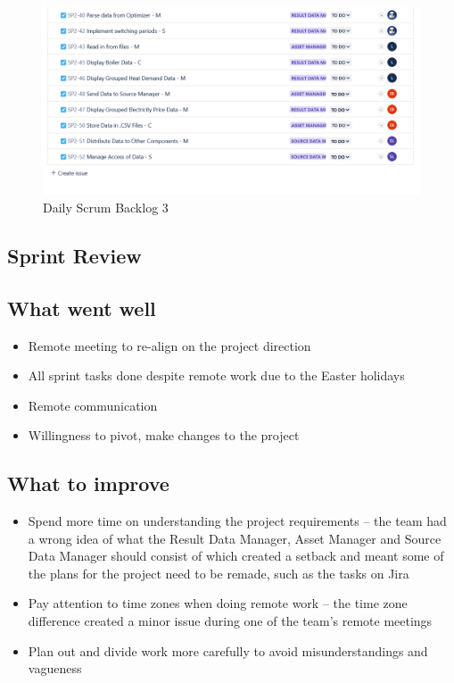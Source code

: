 \documentclass[12pt]{report}
\begin{document}
\begin{figure}[H]
  \centering
  \includegraphics[width=1\textwidth]{Resources/2-Sprint/Daily-Scrum/backlog3.png}
  \caption{Daily Scrum Backlog 3}
  \label{fig:S2Scrum3-image}
\end{figure}


\subsection*{Sprint Review}

\subsection*{What went well}
\begin{itemize}
    \item Remote meeting to re-align on the project direction
    \item All sprint tasks done despite remote work due to the Easter holidays
    \item Remote communication
    \item Willingness to pivot, make changes to the project
\end{itemize}

\subsection*{What to improve}
\begin{itemize}
    \item Spend more time on understanding the project requirements -- the team had a wrong idea of what the Result Data Manager, Asset Manager and Source Data Manager should consist of which created a setback and meant some of the plans for the project need to be remade, such as the tasks on Jira
    \item Pay attention to time zones when doing remote work -- the time zone difference created a minor issue during one of the team's remote meetings
    \item Plan out and divide work more carefully to avoid misunderstandings and vagueness
\end{itemize}
\end{document}
